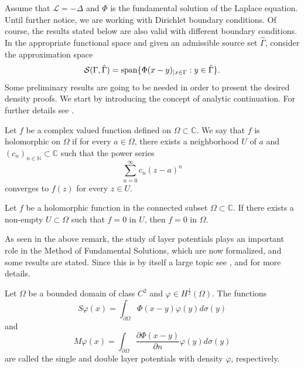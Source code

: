 Assume that \(\mathcal{L} = -\Delta\) and \(\Phi\) is the fundamental solution of the Laplace equation. Until further notice, we are working with Dirichlet boundary conditions. Of course, the results stated below are also valid with different boundary conditions. In the appropriate functional space and given an admissible source set \(\hat{\Gamma}\), consider the approximation space
\[
    \mathcal{S}(\Gamma, \hat{\Gamma}) = \operatorname{span}\{\Phi(x-y)_{|x \in \Gamma} : y \in \hat{\Gamma}\}.
\]
Some preliminary results are going to be needed in order to present the desired density proofs.
We start by introducing the concept of analytic continuation. For further details see \cite{narasimhan2012complex}.
\begin{definition}
    Let \(f\) be a complex valued function defined on \(\Omega \subset \mathbb{C}\). We say that \(f\) is holomorphic on \(\Omega\) if for every \(a \in \Omega\), there exists a neighborhood \(U\) of \(a\) and \((c_n)_{n \in \mathbb{N}} \subset \mathbb{C}\) such that the power series
    \[
        \sum_{n=0}^{\infty} c_n(z-a)^n
    \]
    converges to \(f(z)\) for every \(z \in U\).
\end{definition}
\begin{theorem}\label{ana_cont}
    Let \(f\) be a holomorphic function in the connected subset \(\Omega \subset \mathbb{C}\). If there exists a non-empty \(U \subset \Omega\) such that \(f = 0\) in \(U\), then \(f = 0\) in \(\Omega\).
\end{theorem}
As seen in the above remark, the study of layer potentials plays an important role in the Method of Fundamental Solutions, which are now formalized, and some results are stated. Since this is by itself a large topic see \cite{chen2010boundary}, \cite{kress2013linear} and \cite{colton2013integral} for more details.
\begin{definition}
    Let \(\Omega\) be a bounded domain of class \(C^2\) and \(\varphi \in H^\frac{1}{2}(\Omega)\). The functions
    \[
        S\varphi(x) = \int_{\partial\Omega} \Phi(x-y)\varphi(y) d\sigma(y)
    \]
    and
    \[
        M\varphi(x) = \int_{\partial\Omega} \frac{\partial \Phi(x-y)}{\partial n}\varphi(y) d\sigma(y)
    \]
    are called the single and double layer potentials with density \(\varphi\), respectively.
\end{definition}
